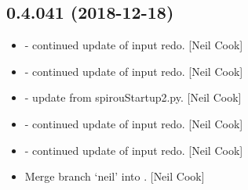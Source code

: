 \documentclass[a4paper,10pt,english]{report}
\begin{document}
\subsection{0.4.041 (2018-12-18)}
\label{\detokenize{misc/changelog:id227}}\begin{itemize}
\item {} 
 - continued update of input redo. {[}Neil Cook{]}

\item {} 
 - continued update of input redo. {[}Neil Cook{]}

\item {} 
 - update from spirouStartup2.py. {[}Neil Cook{]}

\item {} 
 - continued update of input redo. {[}Neil Cook{]}

\item {} 
 - continued update of input redo. {[}Neil Cook{]}

\item {} 
Merge branch ‘neil’ into . {[}Neil Cook{]}

\end{itemize}
\end{document}
